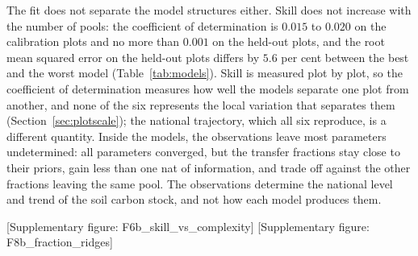 \documentclass[11pt]{article}
\newcommand{\suppfig}[1]{\textcolor{blue!55!black}{\small[Supplementary figure: \textsf{#1}]}}
\begin{document}
The fit does not separate the model structures either. Skill does not increase with
the number of pools: the coefficient of determination is $0.015$ to $0.020$ on the
calibration plots and no more than $0.001$ on the held-out plots, and the root mean
squared error on the held-out plots differs by $5.6$ per cent between the best and the
worst model (Table~\ref{tab:models}). Skill is measured plot by plot, so the
coefficient of determination measures how well the models separate one plot from
another, and none of the six represents the local variation that separates them
(Section~\ref{sec:plotscale}); the national trajectory, which all six reproduce, is a
different quantity. Inside the models, the observations leave most parameters
undetermined: all parameters converged, but the transfer fractions stay close to their
priors, gain less than one nat of information, and trade off against the other
fractions leaving the same pool. The observations determine the national level and
trend of the soil carbon stock, and not how each model produces them.

\begin{table}[htbp]\centering\small

\caption{\textbf{Summary of the six calibrated models.} Number of carbon pools, number of free
parameters, coefficient of determination on calibration plots and on held-out plots, root mean squared
error, the effective litter flux implied by the calibration, and the estimated ratio of the litter
input of 1917 to the litter input of 1985. Skill does not increase as pools are added.}
\label{tab:models}
\end{table}

\suppfig{F6b\_skill\_vs\_complexity}
\suppfig{F8b\_fraction\_ridges}
\end{document}

